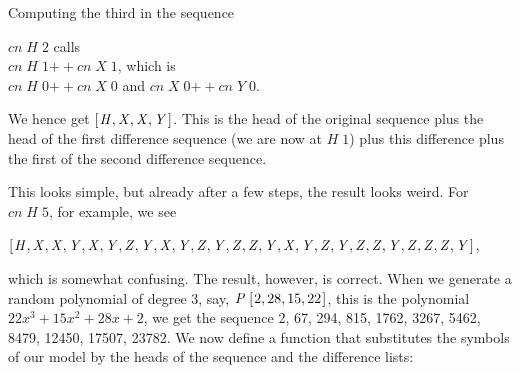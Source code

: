 \documentclass[tikz]{scrreprt}
\newcommand{\Conid}[1]{\mathit{#1}}
\newcommand{\Varid}[1]{\mathit{#1}}
\newcommand{\plus}{\mathbin{+\!\!\!+}}
\begin{document}
Computing the third in the sequence

\ensuremath{\Varid{cn}\;\Conid{H}\;\mathrm{2}} calls\\
\ensuremath{\Varid{cn}\;\Conid{H}\;\mathrm{1}\plus \Varid{cn}\;\Conid{X}\;\mathrm{1}}, which is\\
\ensuremath{\Varid{cn}\;\Conid{H}\;\mathrm{0}\plus \Varid{cn}\;\Conid{X}\;\mathrm{0}} and \ensuremath{\Varid{cn}\;\Conid{X}\;\mathrm{0}\plus \Varid{cn}\;\Conid{Y}\;\mathrm{0}}.

We hence get \ensuremath{[\mskip1.5mu \Conid{H},\Conid{X},\Conid{X},\Conid{Y}\mskip1.5mu]}.
This is the head of the original sequence
plus the head of the first difference sequence
(we are now at \ensuremath{\Conid{H}\;\mathrm{1}})
plus this difference plus the first of
the second difference sequence.

This looks simple, but already after a few steps,
the result looks weird. For \ensuremath{\Varid{cn}\;\Conid{H}\;\mathrm{5}}, for example, we see

\ensuremath{[\mskip1.5mu \Conid{H},\Conid{X},\Conid{X},\Conid{Y},\Conid{X},\Conid{Y},\Conid{Z},\Conid{Y},\Conid{X},\Conid{Y},\Conid{Z},\Conid{Y},\Conid{Z},\Conid{Z},\Conid{Y},\Conid{X},\Conid{Y},\Conid{Z},\Conid{Y},\Conid{Z},\Conid{Z},\Conid{Y},\Conid{Z},\Conid{Z},\Conid{Z},\Conid{Y}\mskip1.5mu]},

which is somewhat confusing. The result, however,
is correct. When we generate a random polynomial of degree 3,
say, \ensuremath{\Conid{P}\;[\mskip1.5mu \mathrm{2},\mathrm{28},\mathrm{15},\mathrm{22}\mskip1.5mu]}, this is the polynomial
$22x^3 + 15x^2 + 28x + 2$, we get the sequence
2, 67, 294, 815, 1762, 3267, 5462, 8479, 12450, 17507, 23782.
We now define a function that substitutes the symbols
of our model by the heads of the sequence and the
difference lists:
\end{document}

